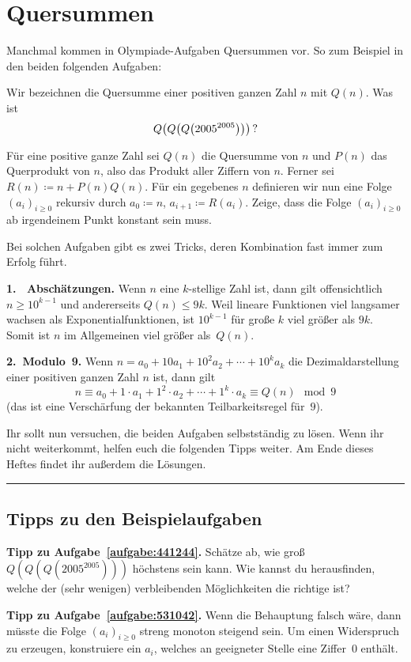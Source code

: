 \section{Quersummen}\label{kapitel:Quersummen}
Manchmal kommen in Olympiade-Aufgaben Quersummen vor. So zum Beispiel in den beiden folgenden Aufgaben:
\begin{aufgabe*}\label{aufgabe:441244}
	Wir bezeichnen die Quersumme einer positiven ganzen Zahl $n$ mit $Q(n)$. Was ist
	\begin{equation*}
		Q\parens*{Q\parens*{Q\parens*{2005^{2005}}}}\,?
	\end{equation*}
\end{aufgabe*}
\begin{aufgabe*}\label{aufgabe:531042}
	Für eine positive ganze Zahl sei $Q(n)$ die Quersumme von $n$ und $P(n)$ das Querprodukt von $n$, also das Produkt aller Ziffern von $n$. Ferner sei $R(n)\coloneqq n+P(n)Q(n)$. Für ein gegebenes $n$ definieren wir nun eine Folge $(a_i)_{i\geqslant 0}$ rekursiv durch $a_0\coloneqq n$, $a_{i+1}\coloneqq R(a_i)$. Zeige, dass die Folge $(a_i)_{i\geqslant 0}$ ab irgendeinem Punkt konstant sein muss.
\end{aufgabe*}

Bei solchen Aufgaben gibt es zwei Tricks, deren Kombination fast immer zum Erfolg führt.

\textbf{1. ~Abschätzungen.} Wenn $n$ eine $k$-stellige Zahl ist, dann gilt offensichtlich $n\geqslant 10^{k-1}$ und andererseits $Q(n)\leqslant 9k$. Weil lineare Funktionen viel langsamer wachsen als Exponentialfunktionen, ist $10^{k-1}$ für große $k$ viel größer als $9k$. Somit ist $n$ im Allgemeinen viel größer als~$Q(n)$.

\textbf{2.~Modulo~9.} Wenn $n=a_0+10a_1+10^2a_2+\dotsb+10^ka_k$ die Dezimaldarstellung einer positiven ganzen Zahl $n$ ist, dann gilt
\begin{equation*}
	n\equiv a_0+1\cdot a_1+1^2\cdot a_2+\dotsb+1^k\cdot a_k\equiv Q(n)\mod 9
\end{equation*}
(das ist eine Verschärfung der bekannten Teilbarkeitsregel für~$9$).

Ihr sollt nun versuchen, die beiden Aufgaben selbstständig zu lösen. Wenn ihr nicht weiterkommt, helfen euch die folgenden Tipps weiter. Am Ende dieses Heftes findet ihr außerdem die Lösungen.

\vfill\hrule\vspace{-1em}

\subsection*{Tipps zu den Beispielaufgaben}

\textbf{Tipp zu Aufgabe~\ref{aufgabe:441244}.} Schätze ab, wie groß $Q(Q(Q(2005^{2005})))$ höchstens sein kann. Wie kannst du herausfinden, welche der (sehr wenigen) verbleibenden Möglichkeiten die richtige ist?

\textbf{Tipp zu Aufgabe~\ref{aufgabe:531042}.} Wenn die Behauptung falsch wäre, dann müsste die Folge $(a_i)_{i\geqslant 0}$ streng monoton steigend sein. Um einen Widerspruch zu erzeugen, konstruiere ein $a_i$, welches an geeigneter Stelle eine Ziffer~$0$ enthält.